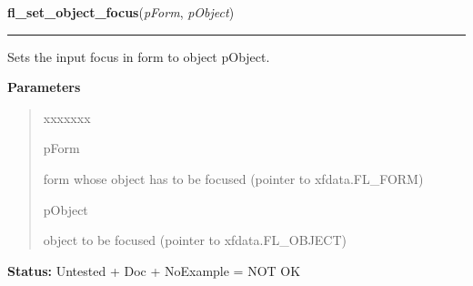 \hspace{.8\funcindent}\begin{boxedminipage}{\funcwidth}

    \raggedright \textbf{fl\_set\_object\_focus}(\textit{pForm}, \textit{pObject})

    \vspace{-1.5ex}

    \rule{\textwidth}{0.5\fboxrule}
\setlength{\parskip}{2ex}
    Sets the input focus in form to object pObject.

\setlength{\parskip}{1ex}
      \textbf{Parameters}
      \vspace{-1ex}

      \begin{quote}
        \begin{Ventry}{xxxxxxx}

          \item[pForm]

          form whose object has to be focused (pointer to xfdata.FL\_FORM)

          \item[pObject]

          object to be focused (pointer to xfdata.FL\_OBJECT)

        \end{Ventry}

      \end{quote}

\textbf{Status:} Untested + Doc + NoExample = NOT OK



    \end{boxedminipage}

    \label{xformslib:library:fl_get_focus_object}

    \vspace{0.5ex}

